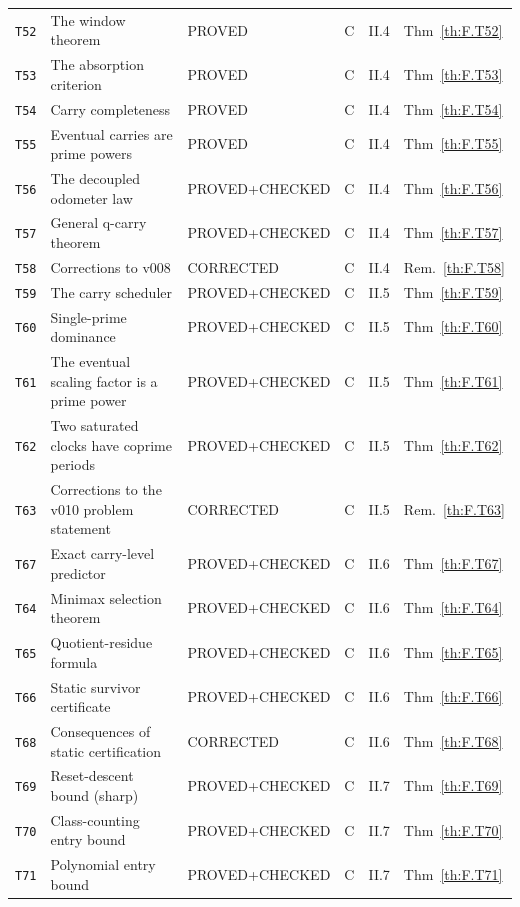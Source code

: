 \begin{longtable}{@{}p{13mm}p{45mm}p{33mm}p{8mm}p{12mm}p{17mm}@{}}
\texttt{T52} & The window theorem & PROVED & C & II.4 & Thm~\ref{th:F.T52} \\
\texttt{T53} & The absorption criterion & PROVED & C & II.4 & Thm~\ref{th:F.T53} \\
\texttt{T54} & Carry completeness & PROVED & C & II.4 & Thm~\ref{th:F.T54} \\
\texttt{T55} & Eventual carries are prime powers & PROVED & C & II.4 & Thm~\ref{th:F.T55} \\
\texttt{T56} & The decoupled odometer law & PROVED+CHECKED & C & II.4 & Thm~\ref{th:F.T56} \\
\texttt{T57} & General q-carry theorem & PROVED+CHECKED & C & II.4 & Thm~\ref{th:F.T57} \\
\texttt{T58} & Corrections to v008 & CORRECTED & C & II.4 & Rem.~\ref{th:F.T58} \\
\texttt{T59} & The carry scheduler & PROVED+CHECKED & C & II.5 & Thm~\ref{th:F.T59} \\
\texttt{T60} & Single-prime dominance & PROVED+CHECKED & C & II.5 & Thm~\ref{th:F.T60} \\
\texttt{T61} & The eventual scaling factor is a prime power & PROVED+CHECKED & C & II.5 & Thm~\ref{th:F.T61} \\
\texttt{T62} & Two saturated clocks have coprime periods & PROVED+CHECKED & C & II.5 & Thm~\ref{th:F.T62} \\
\texttt{T63} & Corrections to the v010 problem statement & CORRECTED & C & II.5 & Rem.~\ref{th:F.T63} \\
\texttt{T67} & Exact carry-level predictor & PROVED+CHECKED & C & II.6 & Thm~\ref{th:F.T67} \\
\texttt{T64} & Minimax selection theorem & PROVED+CHECKED & C & II.6 & Thm~\ref{th:F.T64} \\
\texttt{T65} & Quotient-residue formula & PROVED+CHECKED & C & II.6 & Thm~\ref{th:F.T65} \\
\texttt{T66} & Static survivor certificate & PROVED+CHECKED & C & II.6 & Thm~\ref{th:F.T66} \\
\texttt{T68} & Consequences of static certification & CORRECTED & C & II.6 & Thm~\ref{th:F.T68} \\
\texttt{T69} & Reset-descent bound (sharp) & PROVED+CHECKED & C & II.7 & Thm~\ref{th:F.T69} \\
\texttt{T70} & Class-counting entry bound & PROVED+CHECKED & C & II.7 & Thm~\ref{th:F.T70} \\
\texttt{T71} & Polynomial entry bound & PROVED+CHECKED & C & II.7 & Thm~\ref{th:F.T71} \\

\end{longtable}
